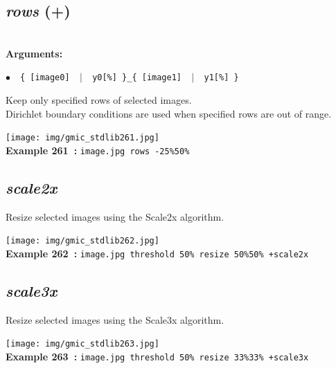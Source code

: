 \documentclass[a4paper,10.5pt,twoside]{book}
\def\comma{\discretionary{,}{}{,}}
\newcommand{\Cb}[1]{\textcolor{cb}{#1}}
\begin{document}
\subsection{\emph{rows} (+)}\vspace*{-0.7em}
~\\\textbf{\Cb{Arguments: }}\begin{flushleft}
{\small \Cb{\hspace*{0.5cm}$\bullet$~~\texttt{\{ [image0] ~$|$~ y0[\%] \}{\comma}\_\{ [image1] ~$|$~ y1[\%] \}}}}\end{flushleft}
Keep only specified rows of selected images.
~\\Dirichlet boundary conditions are used when specified rows are out of range.
\begin{center}\texttt{[image: img/gmic\_stdlib261.jpg]}\\
{\footnotesize \textbf{Example 261~:} \texttt{image.jpg rows -25\%{\comma}50\%}}
\end{center}

\subsection{\emph{scale2x} }\vspace*{-0.7em}
Resize selected images using the Scale2x algorithm.
\begin{center}\texttt{[image: img/gmic\_stdlib262.jpg]}\\
{\footnotesize \textbf{Example 262~:} \texttt{image.jpg threshold 50\% resize 50\%{\comma}50\% +scale2x}}
\end{center}

\subsection{\emph{scale3x} }\vspace*{-0.7em}
Resize selected images using the Scale3x algorithm.
\begin{center}\texttt{[image: img/gmic\_stdlib263.jpg]}\\
{\footnotesize \textbf{Example 263~:} \texttt{image.jpg threshold 50\% resize 33\%{\comma}33\% +scale3x}}
\end{center}
\end{document}
